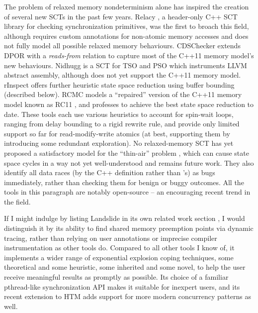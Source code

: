 The problem of relaxed memory nondeterminism alone has inspired the creation of several new SCTs in the past few years.
Relacy \cite{relacy}, a header-only C++ SCT library for checking synchronization primitives,
was the first to broach this field,
although requires custom annotations for non-atomic memory accesses
and
does not fully model all possible relaxed memory behaviours.
CDSChecker \cite{cdschecker} extends DPOR with a {\em reads-from} relation
to capture most of the C++11 memory model's new behaviours.
Nidhugg \cite{nidhugg} is a SCT for TSO and PSO which instruments LLVM abstract assembly,
although does not yet support the C++11 memory model.
rInspect \cite{tsopso}
offers further heuristic state space reduction using buffer bounding (described below).
RCMC \cite{rcmc} models a ``repaired'' version of the C++11 memory model known as RC11 \cite{rc11},
and professes to achieve the best state space reduction to date.
These tools each use various heuristics to account for spin-wait loops,
ranging from delay bounding \cite{bpor} to a rigid rewrite rule,
and provide only limited support so far for read-modify-write atomics
(at best, supporting them by introducing %
some redundant exploration).
%
No relaxed-memory SCT has yet proposed a satisfactory model for the ``thin-air'' problem \cite{sully-thesis},
which can cause state space cycles in a way not yet well-understood and remains future work.
They also identify all data races
(by the C++ definition rather than \sect{\ref{sec:quicksand-soundness}}'s)
as bugs immediately, rather than checking them for benign or buggy outcomes.
All the tools in this paragraph are notably open-source -- an encouraging recent trend in the field.


If I might indulge by listing Landslide in its own related work section \cite{this-thesis},
I would distinguish it by its ability to find shared memory preemption points via dynamic tracing,
rather than relying on user annotations or imprecise compiler instrumentation
as other tools do.
Compared to all other tools I know of,
it implements a wider range of exponential explosion coping techniques,
some theoretical and some heuristic,
some inherited and some novel,
to help the user receive meaningful results as promptly as possible.
Its choice of a familiar pthread-like synchronization API makes it suitable for inexpert users,
and its recent extension to HTM adds support for more modern concurrency patterns as well.

